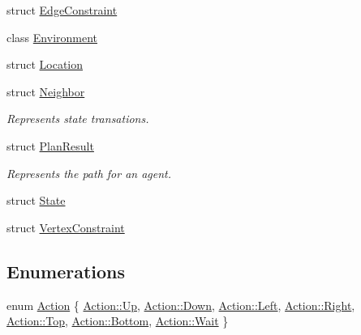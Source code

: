 \begin{DoxyCompactItemize}
struct \hyperlink{structlib_multi_robot_planning_1_1_edge_constraint}{Edge\+Constraint}
\item 
class \hyperlink{classlib_multi_robot_planning_1_1_environment}{Environment}
\item 
struct \hyperlink{structlib_multi_robot_planning_1_1_location}{Location}
\item 
struct \hyperlink{structlib_multi_robot_planning_1_1_neighbor}{Neighbor}
\begin{DoxyCompactList}\small\item\em Represents state transations. \end{DoxyCompactList}\item 
struct \hyperlink{structlib_multi_robot_planning_1_1_plan_result}{Plan\+Result}
\begin{DoxyCompactList}\small\item\em Represents the path for an agent. \end{DoxyCompactList}\item 
struct \hyperlink{structlib_multi_robot_planning_1_1_state}{State}
\item 
struct \hyperlink{structlib_multi_robot_planning_1_1_vertex_constraint}{Vertex\+Constraint}
\end{DoxyCompactItemize}
\subsection*{Enumerations}
\begin{DoxyCompactItemize}
\item 
enum \hyperlink{namespacelib_multi_robot_planning_aba73fb71693f86a324adfa0e41e1053d}{Action} \{ \newline
\hyperlink{namespacelib_multi_robot_planning_aba73fb71693f86a324adfa0e41e1053da258f49887ef8d14ac268c92b02503aaa}{Action\+::\+Up}, 
\hyperlink{namespacelib_multi_robot_planning_aba73fb71693f86a324adfa0e41e1053da08a38277b0309070706f6652eeae9a53}{Action\+::\+Down}, 
\hyperlink{namespacelib_multi_robot_planning_aba73fb71693f86a324adfa0e41e1053da945d5e233cf7d6240f6b783b36a374ff}{Action\+::\+Left}, 
\hyperlink{namespacelib_multi_robot_planning_aba73fb71693f86a324adfa0e41e1053da92b09c7c48c520c3c55e497875da437c}{Action\+::\+Right}, 
\newline
\hyperlink{namespacelib_multi_robot_planning_aba73fb71693f86a324adfa0e41e1053daa4ffdcf0dc1f31b9acaf295d75b51d00}{Action\+::\+Top}, 
\hyperlink{namespacelib_multi_robot_planning_aba73fb71693f86a324adfa0e41e1053da2ad9d63b69c4a10a5cc9cad923133bc4}{Action\+::\+Bottom}, 
\hyperlink{namespacelib_multi_robot_planning_aba73fb71693f86a324adfa0e41e1053da0f68101772bd5397ef8eb1b632798652}{Action\+::\+Wait}
 \}
\end{DoxyCompactItemize}
